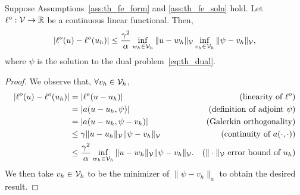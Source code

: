 \begin{proposition}
  \label{prop:th_output_nonsym}
   Suppose Assumptions~\eqref{ass:th_fe_form} and \eqref{ass:th_fe_soln} hold. Let $\ell^o: \mathcal{V} \to \mathbb{R}$ be a continuous linear functional.  Then,
\begin{equation*}
  |\ell^o(u) - \ell^o(u_h)|
  \leq \frac{\gamma^2}{\alpha} \inf_{w_h \in \mathcal{V}_h} \| u - w_h \|_{\mathcal{V}} \inf_{v_h \in \mathcal{V}_h} \| \psi - v_h \|_{\mathcal{V}},
\end{equation*}
where $\psi$ is the solution to the dual problem~\ref{eq:th_dual}.
\begin{proof}
  We observe that, $\forall v_h \in \mathcal{V}_h$, 
  \begin{align*}
    |\ell^o(u) - \ell^o(u_h)|
    &= |\ell^o(u - u_h)| & \text{(linearity of $\ell^o$)} \\
    &= |a(u-u_h,\psi)| & \text{(definition of adjoint $\psi$)} \\
    &= |a(u-u_h,\psi-v_h)| & \text{(Galerkin orthogonality)} \\
    &\leq \gamma \| u - u_h \|_{\mathcal{V}} \| \psi - v_h \|_{\mathcal{V}} & \text{(continuity of $a(\cdot,\cdot)$)} \\
    &\leq \frac{\gamma^2}{\alpha} \inf_{w_h \in \mathcal{V}_h} \| u - w_h \|_{\mathcal{V}} \| \psi - v_h \|_{\mathcal{V}}. & \text{($\| \cdot \|_{\mathcal{V}}$ error bound of $u_h$)}
  \end{align*}
  We then take $v_h \in \mathcal{V}_h$ to be the minimizer of $\| \psi - v_h \|_a$ to obtain the desired result.
\end{proof}
\end{proposition}

